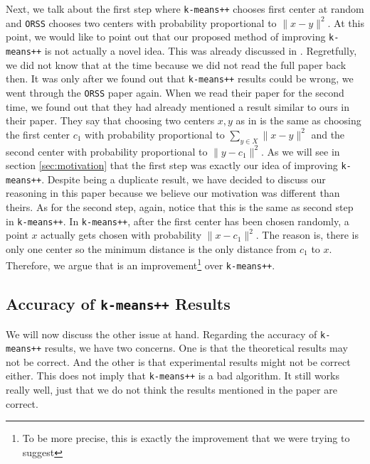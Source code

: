 \documentclass[12pt]{article}
\begin{document}
	Next, we talk about the first step where \texttt{k-means++} chooses first center at random and \texttt{ORSS} chooses two centers with probability proportional to $\|x-y\|^2$. At this point, we would like to point out that our proposed method of improving \texttt{k-means++} is not actually a novel idea. This was already discussed in \textcite{ostrovsky_rabani_schulman_swamy_2012}. Regretfully, we did not know that at the time because we did not read the full paper back then. It was only after we found out that \texttt{k-means++} results could be wrong, we went through the \texttt{ORSS} paper again. When we read their paper for the second time, we found out that they had already mentioned a result \textcite[Page 4, section 3, Paragraph: Running Time]{ostrovsky_rabani_schulman_swamy_2012} similar to ours in their paper. They say that choosing two centers $x,y$ as in \textcite{ostrovsky_rabani_schulman_swamy_2012} is the same as choosing the first center $c_1$ with probability proportional to $\sum_{y\in X}\|x-y\|^2$ and the second center with probability proportional to $\|y-c_1\|^2$. As we will see in section \ref{sec:motivation} that the first step was exactly our idea of improving \texttt{k-means++}. Despite being a duplicate result, we have decided to discuss our reasoning in this paper because we believe our motivation was different than theirs. As for the second step, again, notice that this is the same as second step in \texttt{k-means++}. In \texttt{k-means++}, after the first center has been chosen randomly, a point $x$ actually gets chosen with probability $\|x-c_1\|^2$. The reason is, there is only one center so the minimum distance is the only distance from $c_1$ to $x$. Therefore, we argue that \textcite{ostrovsky_rabani_schulman_swamy_2012} is an improvement\footnote{To be more precise, this is exactly the improvement that we were trying to suggest} over \texttt{k-means++}.
	\subsection{Accuracy of \texttt{k-means++} Results}
	We will now discuss the other issue at hand. Regarding the accuracy of \texttt{k-means++} results, we have two concerns. One is that the theoretical results may not be correct. And the other is that experimental results might not be correct either. This does not imply that \texttt{k-means++} is a bad algorithm. It still works really well, just that we do not think the results mentioned in the paper are correct.
\end{document}
